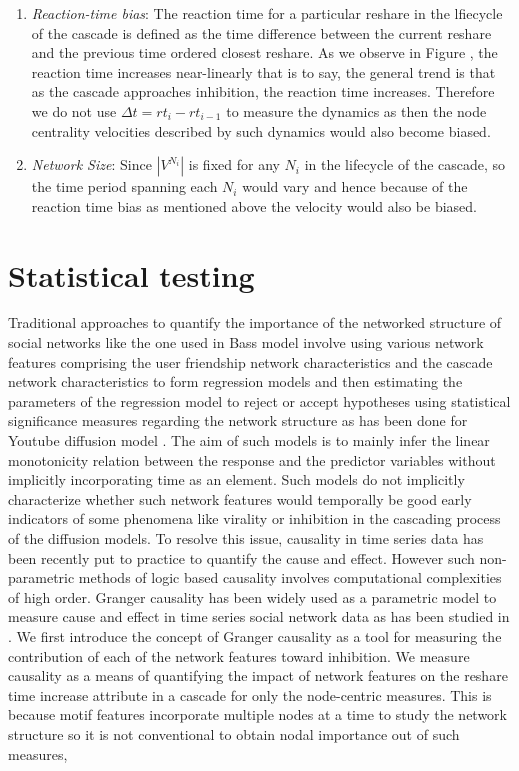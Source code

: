 \documentclass[smallextended]{svjour3}       %
\theoremstyle{definition}
\begin{document}
\begin{enumerate}
	\item \textit{Reaction-time bias}: The reaction time for a particular reshare in the lfiecycle of the cascade is defined as the time difference between the current reshare and the previous time ordered closest reshare. As we observe in Figure , the reaction time increases near-linearly that is to say, the general trend is that as the cascade approaches inhibition, the reaction time increases. Therefore we do not use $\Delta t = rt_i - rt_{i-1}$ to measure the dynamics as then the node centrality velocities described by such dynamics would also become biased. 
	
	\item \textit{Network Size}: Since $|V^{N_i}|$ is fixed for any $N_i$ in the lifecycle of the cascade, so the time period spanning each $N_i$ would vary and hence because of the reaction time bias as mentioned above the velocity would also be biased.
\end{enumerate}


\section{Statistical testing}
Traditional approaches to quantify the importance of the networked structure of social networks like the one used in Bass model \cite{bass} involve using various network features comprising the user friendship network characteristics and the cascade network characteristics to form regression models and then estimating the parameters of the regression model to reject or accept hypotheses using statistical significance measures regarding the network structure as has been done for Youtube diffusion model \cite{youtube_susarla}. The aim of such models is to mainly infer the linear monotonicity relation between the response and the predictor variables without implicitly incorporating time as an element. Such models do not implicitly characterize whether such network features would temporally be good early indicators of some phenomena like virality or inhibition in the cascading process of the diffusion models. To resolve this issue, causality in time series data \cite{kleinberg} has been recently put to practice to quantify the cause and effect. However such non-parametric methods of logic based causality involves computational complexities of high order. Granger causality \cite{granger_causality} has been widely used as a parametric model to measure cause and effect in time series social network data as has been studied in \cite{granger_inf}. We first introduce the concept of Granger causality as a tool for measuring the contribution of each of the network features toward inhibition. We measure causality as a means of quantifying the impact of network features on the reshare time increase attribute in a cascade for only the node-centric measures. This is because motif features incorporate multiple nodes at a time to study the network structure so it is not conventional to obtain nodal importance out of such measures, 
\end{document}
